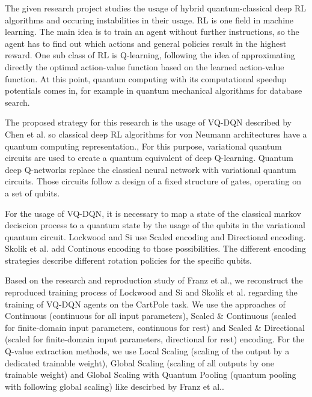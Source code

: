 The given research project studies the usage of hybrid quantum-classical deep \ac{RL} algorithms and occuring instabilities in their usage.
\ac{RL} is one field in machine learning.
The main idea is to train an agent without further instructions, so the agent has to find out which actions and general policies result in the highest reward.
One sub class of \ac{RL} is Q-learning, following the idea of approximating directly the optimal action-value function based on the learned action-value function.\autocite{rl}
At this point, quantum computing with its computational speedup potentials comes in, for example in quantum mechanical algorithms for database search\autocite{databasesearch}. 



The proposed strategy for this research is the usage of \ac{VQ-DQN} described by Chen et al. so classical deep \ac{RL} algorithms for von Neumann architectures have a quantum computing representation.\autocite{vqdqn},
For this purpose, variational quantum circuits are used to create a quantum equivalent of deep Q-learning.
Quantum deep Q-networks replace the classical neural network with variational quantum circuits.
Those circuits follow a design of a fixed structure of gates, operating on a set of qubits.\autocite{circuits}


For the usage of \ac{VQ-DQN}, it is necessary to map a state of the classical markov deciscion process to a quantum state by the usage of the qubits in the variational quantum circuit. 
Lockwood and Si use Scaled encoding and Directional encoding.\autocite{lockwood}
Skolik et al. add Continous encoding to those possibilities.\autocite{skolik} 
The different encoding strategies describe different rotation policies for the specific qubits.


Based on the research and reproduction study of Franz et al.\autocite{instabilities}, we reconstruct the reproduced training process of Lockwood and Si\autocite{lockwood} and Skolik et al.\autocite{skolik} regarding the training of \ac{VQ-DQN} agents on the CartPole task. 
We use the approaches of Continuous (continuous for all input parameters), Scaled \& Continuous (scaled for finite-domain input parameters, continuous for rest) and Scaled \& Directional (scaled for finite-domain input parameters, directional for rest) encoding. 
For the Q-value extraction methods, we use Local Scaling (scaling of the output by a dedicated trainable weight), Global Scaling (scaling of all outputs by one trainable weight) and Global Scaling with Quantum Pooling (quantum pooling with following global scaling) like descirbed by Franz et al.\autocite{instabilities}.
